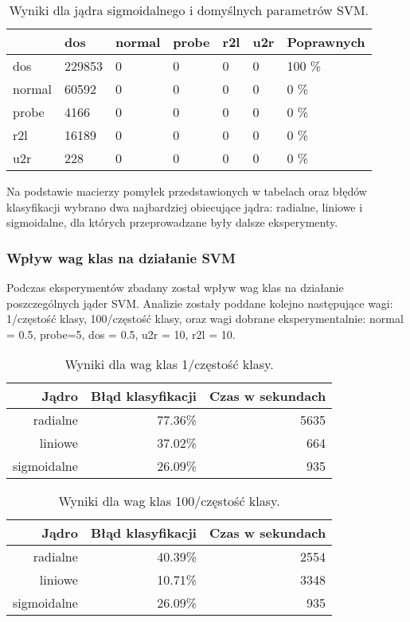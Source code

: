 \documentclass[a4paper, 12pt]{article}
\begin{document}
\begin{table}[H]
\centering
\caption{Wyniki dla jądra sigmoidalnego i domyślnych parametrów SVM.}
\label{table:cm_svm_sigmoid_default}
\begin{tabular}{ | l | l | l | l | l | l | l | } \hline
	& dos & normal &  probe  &  r2l  &  u2r 	& Poprawnych	\\ \hline
  dos    & 229853  &  0  &  0  &  0   &   0  & 100 \% \\ \hline
  normal &  60592  &   0  &  0  &  0  &   0 & 0 \% \\ \hline
  probe  &   4166  &    0  &  0 &   0 &  0  & 0 \% \\ \hline
  r2l    &  16189  &    0  &  0 &   0   &  0  & 0 \% \\ \hline
  u2r    &   228  &    0  &    0  &   0    &  0  & 0 \% \\ \hline
\end{tabular} 
\end{table}

Na podstawie macierzy pomyłek przedstawionych w tabelach oraz błędów klasyfikacji wybrano dwa najbardziej obiecujące jądra: radialne, liniowe i sigmoidalne, dla których przeprowadzane były dalsze eksperymenty.

\subsubsection{Wpływ wag klas na działanie SVM}
Podczas eksperymentów zbadany został wpływ wag klas na działanie poszczególnych jąder SVM. Analizie zostały poddane kolejno następujące wagi: 1/częstość klasy, 100/częstość klasy, oraz wagi dobrane eksperymentalnie: normal = 0.5, probe=5, dos = 0.5, u2r = 10, r2l = 10.

\begin{table}[H]
\centering
\begin{tabular}{ | r | r | r | } \hline
Jądro & Błąd klasyfikacji & Czas w sekundach \\ \hline
radialne & 77.36\% & 5635 \\ \hline
liniowe & 37.02\% & 664 \\ \hline
sigmoidalne & 26.09\% & 935 \\ \hline
\end{tabular} 
\caption{Wyniki dla wag klas 1/częstość klasy.}
\end{table}

\begin{table}[H]
\centering
\begin{tabular}{ | r | r | r | } \hline
Jądro & Błąd klasyfikacji & Czas w sekundach \\ \hline
radialne & 40.39\% & 2554 \\ \hline
liniowe & 10.71\% & 3348 \\ \hline
sigmoidalne & 26.09\% & 935 \\ \hline
\end{tabular} 
\caption{Wyniki dla wag klas 100/częstość klasy.}
\end{table}
\end{document}
